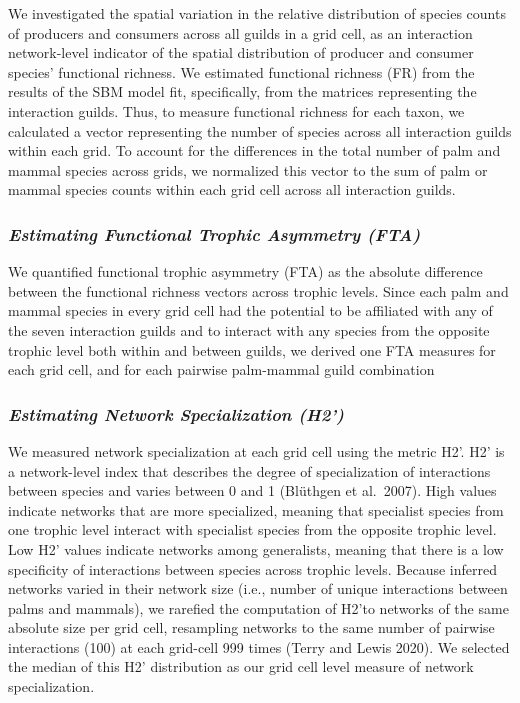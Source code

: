 \documentclass[
]{agujournal2019}
\begin{document}
We investigated the spatial variation in the relative distribution of
species counts of producers and consumers across all guilds in a grid
cell, as an interaction network-level indicator of the spatial
distribution of producer and consumer species' functional richness. We
estimated functional richness (FR) from the results of the SBM model
fit, specifically, from the matrices representing the interaction
guilds. Thus, to measure functional richness for each taxon, we
calculated a vector representing the number of species across all
interaction guilds within each grid. To account for the differences in
the total number of palm and mammal species across grids, we normalized
this vector to the sum of palm or mammal species counts within each grid
cell across all interaction guilds.

\subsubsection{\texorpdfstring{\emph{Estimating Functional Trophic
Asymmetry
(FTA)}}{Estimating Functional Trophic Asymmetry (FTA)}}\label{estimating-functional-trophic-asymmetry-fta}

We quantified functional trophic asymmetry (FTA) as the absolute
difference between the functional richness vectors across trophic
levels. Since each palm and mammal species in every grid cell had the
potential to be affiliated with any of the seven interaction guilds and
to interact with any species from the opposite trophic level both within
and between guilds, we derived one FTA measures for each grid cell, and
for each pairwise palm-mammal guild combination

\subsubsection{\texorpdfstring{\emph{Estimating Network Specialization
(H2')}}{Estimating Network Specialization (H2')}}\label{estimating-network-specialization-h2}

We measured network specialization at each grid cell using the metric
H2'. H2' is a network-level index that describes the degree of
specialization of interactions between species and varies between 0 and
1 (Blüthgen et al.~2007). High values indicate networks that are more
specialized, meaning that specialist species from one trophic level
interact with specialist species from the opposite trophic level. Low
H2' values indicate networks among generalists, meaning that there is a
low specificity of interactions between species across trophic levels.
Because inferred networks varied in their network size (i.e., number of
unique interactions between palms and mammals), we rarefied the
computation of H2'to networks of the same absolute size per grid cell,
resampling networks to the same number of pairwise interactions (100) at
each grid-cell 999 times (Terry and Lewis 2020). We selected the median
of this H2' distribution as our grid cell level measure of network
specialization.
\end{document}
